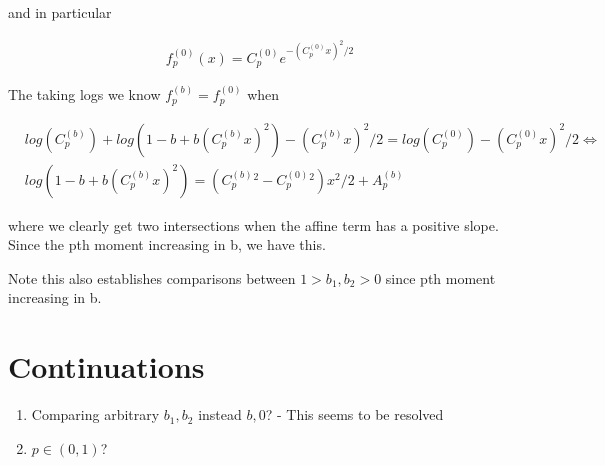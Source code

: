 \documentclass[11pt]{article}
\theoremstyle{remark}
\begin{document}
and in particular

\begin{align*}
	f^{(0)}_p(x) = C_p^{(0)}e^{-(C_p^{(0)}x)^2/2}
\end{align*}

The taking logs we know $f^{(b)}_p = f^{(0)}_p$ when

\begin{align*}
	& log(C^{(b)}_p) +log(1-b+b(C^{(b)}_px)^2)-(C^{(b)}_px)^2/2=log(C^{(0)}_p) -(C^{(0)}_px)^2/2 \iff \\
	&  log(1-b+b(C_p^{(b)}x)^2) = (C_p^{(b)}^2-C_p^{(0)}^2)x^2/2+A_p^{(b)}
\end{align*}

where we clearly get two intersections when the affine term has a positive slope. Since the pth moment increasing in b, we have this. 

Note this also establishes comparisons between $1>b_1,b_2 >0$ since pth moment increasing in b.

\section{Continuations}

\begin{enumerate}
\item Comparing arbitrary $b_1,b_2$ instead $b,0$? - This seems to be resolved
\item $p \in (0,1)$? 
\end{enumerate}
\end{document}
